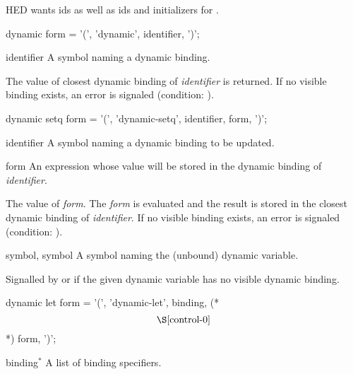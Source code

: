 \label{control-1}
%
\begin{optPrivate}
    HED wants ids as well as ids and initializers for .
\end{optPrivate}
%
\begin{optDefinition}
%
%
\Syntax
\savesyntax\dynamicSyntax\vbox{\syntax
dynamic form
   = '(', 'dynamic', identifier, ')';
\endsyntax}
%
\begin{arguments}
    \item[identifier] A symbol naming a dynamic binding.
\end{arguments}
%
\result%
The value of closest dynamic binding of {\em identifier} is returned.  If no
visible binding exists, an error is signaled (condition:
).

%
\Syntax
\savesyntax\dynamicSetqSyntax\vbox{\syntax
dynamic setq form
   = '(', 'dynamic-setq', identifier, form, ')';
\endsyntax}
%
\begin{arguments}
    \item[identifier] A symbol naming a dynamic binding to be updated.

    \item[form] An expression whose value will be stored in the dynamic binding
    of {\em identifier}.
\end{arguments}
%
\result%
The value of {\em form}.
%
\remarks%
The {\em form} is evaluated and the result is stored in the closest dynamic
binding of {\em identifier}.  If no visible binding exists, an error is signaled
(condition:
).

%
\begin{initoptions}
    \item[symbol, symbol] A symbol naming the (unbound) dynamic variable.
\end{initoptions}
%
\remarks%
Signalled by  or  if the given
dynamic variable has no visible dynamic binding.

%
\Syntax
\savesyntax\dynamicLetSyntax\vbox{\syntax
dynamic let form
   = '(', 'dynamic-let',
     {binding}, (* \[\S\ref{control-0}\] *)
     {form}, ')';
\endsyntax}
%
\begin{arguments}
    \item[binding\/$^*$] A list of binding specifiers.


\end{arguments}
\end{optDefinition}
